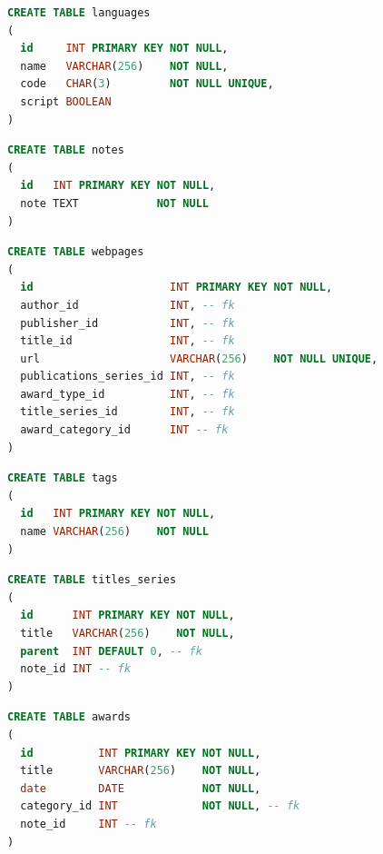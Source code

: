 \documentclass[doubleside, titlepage]{article}
\begin{document}
\begin{lstlisting}[language=SQL,showspaces=false,basicstyle=\ttfamily,numberstyle=\tiny,commentstyle=\color{gray}
        ]
CREATE TABLE languages
(
  id     INT PRIMARY KEY NOT NULL,
  name   VARCHAR(256)    NOT NULL,
  code   CHAR(3)         NOT NULL UNIQUE,
  script BOOLEAN
)
\end{lstlisting}

\begin{lstlisting}[language=SQL,showspaces=false,basicstyle=\ttfamily,numberstyle=\tiny,commentstyle=\color{gray}
        ]
CREATE TABLE notes
(
  id   INT PRIMARY KEY NOT NULL,
  note TEXT            NOT NULL
)
\end{lstlisting}

\begin{lstlisting}[language=SQL,showspaces=false,basicstyle=\ttfamily,numberstyle=\tiny,commentstyle=\color{gray}
        ]
CREATE TABLE webpages
(
  id                     INT PRIMARY KEY NOT NULL,
  author_id              INT, -- fk
  publisher_id           INT, -- fk
  title_id               INT, -- fk
  url                    VARCHAR(256)    NOT NULL UNIQUE,
  publications_series_id INT, -- fk
  award_type_id          INT, -- fk
  title_series_id        INT, -- fk
  award_category_id      INT -- fk
)
\end{lstlisting}

\begin{lstlisting}[language=SQL,showspaces=false,basicstyle=\ttfamily,numberstyle=\tiny,commentstyle=\color{gray}
        ]
CREATE TABLE tags
(
  id   INT PRIMARY KEY NOT NULL,
  name VARCHAR(256)    NOT NULL
)
\end{lstlisting}

\begin{lstlisting}[language=SQL,showspaces=false,basicstyle=\ttfamily,numberstyle=\tiny,commentstyle=\color{gray}
        ]
CREATE TABLE titles_series
(
  id      INT PRIMARY KEY NOT NULL,
  title   VARCHAR(256)    NOT NULL,
  parent  INT DEFAULT 0, -- fk
  note_id INT -- fk
)
\end{lstlisting}

\newpage

\begin{lstlisting}[language=SQL,showspaces=false,basicstyle=\ttfamily,numberstyle=\tiny,commentstyle=\color{gray}
        ]
CREATE TABLE awards
(
  id          INT PRIMARY KEY NOT NULL,
  title       VARCHAR(256)    NOT NULL,
  date        DATE            NOT NULL,
  category_id INT             NOT NULL, -- fk
  note_id     INT -- fk
)
\end{lstlisting}
\end{document}
